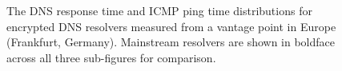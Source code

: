 \begin{figure}[t!]
\hspace*{-1in}
\begin{minipage}{1.35\textwidth}
\centering
{}%
\hfill%
%
\hfill%
%
    \caption{The DNS response time and ICMP ping time distributions for
    encrypted DNS resolvers measured from a vantage point in Europe (Frankfurt,
    Germany). Mainstream resolvers are shown in boldface across all three
    sub-figures for comparison.}
\label{fig:dns-europe}
\end{minipage}
\end{figure}

